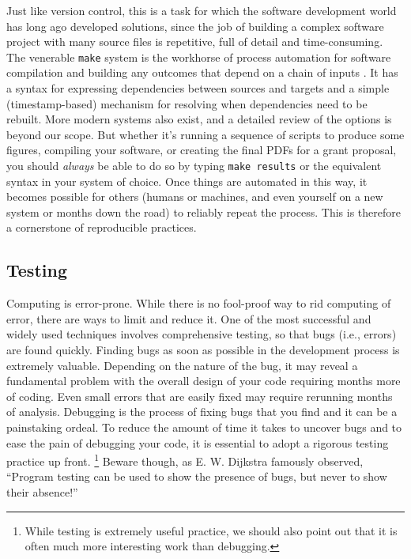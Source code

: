 \documentclass[ChapterTOCs,krantz2]{krantz} %
\begin{document}
Just like version control, this is a task for which the software development
world has long ago developed solutions, since the job of building a complex
software project with many source files is repetitive, full of detail and
time-consuming.  The venerable \texttt{make} system is the workhorse of process
automation for software compilation and building any outcomes that depend on a
chain of inputs \cite{make:2004}.  It has a syntax for expressing dependencies
between sources and targets and a simple (timestamp-based) mechanism for
resolving when dependencies need to be rebuilt.  More modern systems also
exist, and a detailed review of the options is beyond our scope.  But whether
it's running a sequence of scripts to produce some figures, compiling your
software, or creating the final PDFs for a grant proposal, you should
\emph{always} be able to do so by typing \texttt{make results} or the
equivalent syntax in your system of choice.  Once things are automated in this
way, it becomes possible for others (humans or machines, and even yourself on a
new system or months down the road) to reliably repeat the process.  This is
therefore a cornerstone of reproducible practices.


\subsection{Testing}

Computing is error-prone. While there is no fool-proof way to rid computing of
error, there are ways to limit and reduce it. One of the most successful and
widely used techniques involves comprehensive testing, so that bugs (i.e.,
errors) are found quickly.  Finding bugs as soon as possible in the development
process is extremely valuable.  Depending on the nature of the bug, it may
reveal a fundamental problem with the overall design of your code requiring
months more of coding.  Even small errors that are easily fixed may require
rerunning months of analysis.  Debugging is the process of fixing bugs that you
find and it can be a painstaking ordeal. To reduce the amount of time it takes
to uncover bugs and to ease the pain of debugging your code, it is essential to
adopt a rigorous testing practice up front.%
\footnote{While testing is extremely useful
practice, we should also point out that it is often much more interesting work
than debugging.} Beware though, as E. W. Dijkstra famously observed, ``Program
testing can be used to show the presence of bugs, but never to show their
absence!'' \cite{dahl1972structured}
\end{document}
